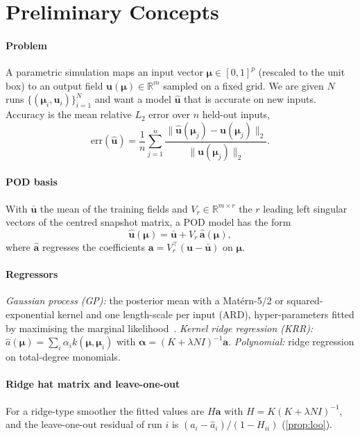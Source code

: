 \section{Preliminary Concepts}\label{sec:prelim}
\paragraph{Problem} A parametric simulation maps an input vector $\boldsymbol\mu\in[0,1]^p$ (rescaled to the unit box) to an output field $\mathbf u(\boldsymbol\mu)\in\mathbb R^m$ sampled on a fixed grid. We are given $N$ runs $\{(\boldsymbol\mu_i,\mathbf u_i)\}_{i=1}^N$ and want a model $\hat{\mathbf u}$ that is accurate on new inputs. Accuracy is the mean relative $L_2$ error over $n$ held-out inputs,
\begin{equation}\label{eq:err}
\mathrm{err}(\hat{\mathbf u})=\frac1n\sum_{j=1}^{n}\frac{\lVert\hat{\mathbf u}(\boldsymbol\mu_j)-\mathbf u(\boldsymbol\mu_j)\rVert_2}{\lVert\mathbf u(\boldsymbol\mu_j)\rVert_2}.
\end{equation}
\paragraph{POD basis} With $\bar{\mathbf u}$ the mean of the training fields and $V_r\in\mathbb R^{m\times r}$ the $r$ leading left singular vectors of the centred snapshot matrix, a POD model has the form
\begin{equation}\label{eq:pod}
\hat{\mathbf u}(\boldsymbol\mu)=\bar{\mathbf u}+V_r\,\hat{\mathbf a}(\boldsymbol\mu),
\end{equation}
where $\hat{\mathbf a}$ regresses the coefficients $\mathbf a=V_r^\top(\mathbf u-\bar{\mathbf u})$ on $\boldsymbol\mu$.
\paragraph{Regressors} \emph{Gaussian process (GP):} the posterior mean with a Mat\'ern-5/2 or squared-exponential kernel and one length-scale per input (ARD), hyper-parameters fitted by maximising the marginal likelihood~\cite{rasmussen2006}. \emph{Kernel ridge regression (KRR):} $\hat a(\boldsymbol\mu)=\sum_i\alpha_i k(\boldsymbol\mu,\boldsymbol\mu_i)$ with $\boldsymbol\alpha=(K+\lambda N I)^{-1}\mathbf a$. \emph{Polynomial:} ridge regression on total-degree monomials.
\paragraph{Ridge hat matrix and leave-one-out} For a ridge-type smoother the fitted values are $H\mathbf a$ with $H=K(K+\lambda N I)^{-1}$, and the leave-one-out residual of run $i$ is $(a_i-\hat a_i)/(1-H_{ii})$ (\cref{prop:loo}).
